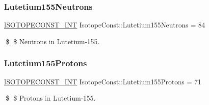 \subsubsection{\texorpdfstring{Lutetium155\+Neutrons}{Lutetium155Neutrons}}
{\footnotesize\ttfamily \mbox{\hyperlink{group___isotope_const-_macros_ga5f18360b3e99483a35c32d789e62621c}{I\+S\+O\+T\+O\+P\+E\+C\+O\+N\+S\+T\+\_\+\+I\+NT}} Isotope\+Const\+::\+Lutetium155\+Neutrons = 84}

\$ \$ Neutrons in Lutetium-\/155. \mbox{\label{group___isotope_const-_lutetium-_lu155_gaebb89d7890413709e402dba72e5988dd}} 
\subsubsection{\texorpdfstring{Lutetium155\+Protons}{Lutetium155Protons}}
{\footnotesize\ttfamily \mbox{\hyperlink{group___isotope_const-_macros_ga5f18360b3e99483a35c32d789e62621c}{I\+S\+O\+T\+O\+P\+E\+C\+O\+N\+S\+T\+\_\+\+I\+NT}} Isotope\+Const\+::\+Lutetium155\+Protons = 71}

\$ \$ Protons in Lutetium-\/155. 